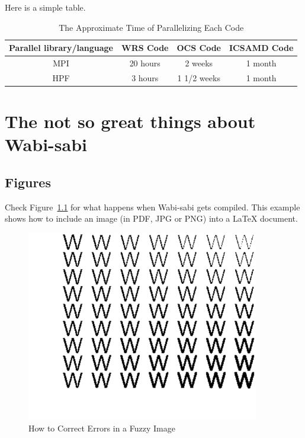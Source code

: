 \documentclass[dissertation]{bsu-cs}  %
\begin{document}
Here is a simple table.

\begin{table}[ht] %
\caption{The Approximate Time of Parallelizing Each Code}
\label{table4}
\centering %
\begin{tabular}{|c|c|c|c|}\hline \hline
Parallel library/language  &WRS Code  &OCS Code  &ICSAMD Code\\ \hline
MPI                        &20 hours  &2 weeks   &1 month\\ \hline
HPF                        &3 hours   &1 1/2 weeks  &1 month\\ \hline
\end{tabular}
\end{table}


%
%

\chapter{The not so great things about Wabi-sabi}

\section{Figures}
Check Figure~\ref{fig:fuzzyImage} for what happens when Wabi-sabi gets compiled. This example
shows how to include an image (in PDF, JPG or PNG) into a LaTeX document.

\begin{figure}[ht]
\begin{center}
\includegraphics*[width=4.0in,keepaspectratio]{figure}
\end{center}
\caption{How to Correct Errors in a Fuzzy Image}
\label{fig:fuzzyImage}
\end{figure}
\end{document}

